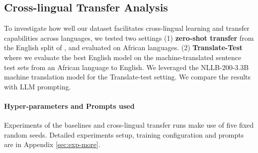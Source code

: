     
\subsection{Cross-lingual Transfer Analysis}
To investigate how well our dataset facilitates cross-lingual learning and transfer capabilities across languages,
we tested two settings (1) \textbf{zero-shot transfer} from the English split of \dataset{}, and evaluated on African languages. (2) \textbf{Translate-Test} where we evaluate the best English model on the machine-translated sentence test sets from an African language to English. We leveraged the NLLB-200-3.3B~\cite{NLLB}  machine translation model for the Translate-test setting. We compare the results with LLM prompting. 



\begin{comment}
    

\begin{table}[h]
\centering
\resizebox{\columnwidth}{!}{%
\begin{tabular}{ll}
\toprule
\textbf{Dataset} & \textbf{Description} [Train Split] \\
\midrule
eng & 1,047 samples from Injongo English train split\\
clinc & 1,040 samples from CLINC, matching Injongo intents\\
eng+clinc & Combined training samples from ``eng'' and ``clinc''\\
clinc+extend & Extend ``clinc'' with additional 1,040 CLINC samples\\
\bottomrule
\end{tabular}
}
\caption{Additional English datasets from CLINC.}
\label{tab:validation-datasets}
\end{table}
\end{comment}

\paragraph{Hyper-parameters and Prompts used} %
Experiments of the baselines and cross-lingual transfer runs make use of five fixed random seeds. 
Detailed experiments setup, training configuration and prompts are in Appendix \ref{sec:exp-more}.